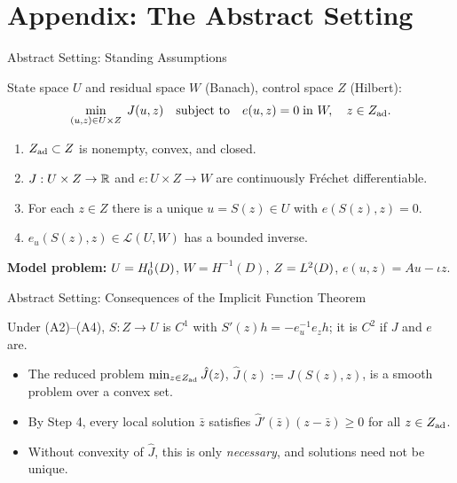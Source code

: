 \documentclass[main.tex]{subfiles}
\begin{document}
\section{Appendix: The Abstract Setting}

\begin{frame}[label=abstract]{Abstract Setting: Standing Assumptions}
  \begin{hlbox}
    State space $U$ and residual space $W$ (Banach), control space $Z$ (Hilbert):
    \[
      \min_{(u,z) \in U \times Z}\; J(u,z) \quad\text{subject to}\quad e(u,z) = 0 \;\text{in } W, \quad z \in Z_{\rm ad}.
    \]
  \end{hlbox}

  \begin{hlbox}
    \begin{enumerate}
      \item[(A1)] $Z_{\rm ad} \subset Z$ is nonempty, convex, and closed.
      \item[(A2)] $J : U \times Z \to \mathbb{R}$ and $e : U \times Z \to W$ are continuously Fr\'echet differentiable.
      \item[(A3)] For each $z \in Z$ there is a unique $u = S(z) \in U$ with $e(S(z),z) = 0$.
      \item[(A4)] $e_u(S(z),z) \in \mathcal{L}(U,W)$ has a bounded inverse.
    \end{enumerate}
  \end{hlbox}

  \begin{qbox}
    \textbf{Model problem:} $U = H^1_0(D)$, $W = H^{-1}(D)$, $Z = L^2(D)$, \; $e(u,z) = Au - \iota z$.
  \end{qbox}
  \vfill\hfill\hyperlink{general<3>}{}
\end{frame}

\begin{frame}{Abstract Setting: Consequences of the Implicit Function Theorem}
  \begin{hlbox}
    Under (A2)--(A4), $S : Z \to U$ is $C^1$ with $S'(z)h = -e_u^{-1}e_z h$; it is $C^2$ if $J$ and $e$ are.
  \end{hlbox}

  \begin{hlbox}
    \begin{itemize}
      \item The reduced problem $\min_{z \in Z_{\rm ad}} \hat J(z)$, $\hat J(z) := J(S(z),z)$, is a smooth problem over a convex set.
      \item By Step 4, every local solution $\bar z$ satisfies $\hat J'(\bar z)(z - \bar z) \ge 0$ for all $z \in Z_{\rm ad}$.
      \item Without convexity of $\hat J$, this is only \emph{necessary}, and solutions need not be unique.
    \end{itemize}
  \end{hlbox}
  \vfill\hfill\hyperlink{general<3>}{}
\end{frame}
\end{document}
